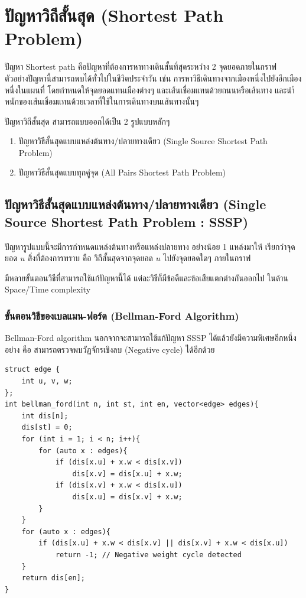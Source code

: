 \chapter{ปัญหาวิถีสั้นสุด (Shortest Path Problem)}

ปัญหา Shortest path คือปัญหาที่ต้องการหาทางเดินสั้นที่สุดระหว่าง 2 จุดยอดภายในกราฟ ตัวอย่างปัญหานี้สามารถพบได้ทั่วไปในชีวิตประจำวัน เช่น การหาวิธีเดินทางจากเมืองหนึ่งไปยังอีกเมืองหนึ่งในแผนที่ โดยกำหนดให้จุดยอดแทนเมืองต่างๆ และเส้นเชื่อมแทนด้วยถนนหรือเส้นทาง และนำ้หนักของเส้นเชื่อมแทนด้วยเวลาที่ใช้ในการเดินทางบนเส้นทางนั้นๆ

ปัญหาวิถีสั้นสุด สามารถแบบออกได้เป็น 2 รูปแบบหลักๆ
\begin{enumerate}
\item ปัญหาวิธีสั้นสุดแบบแหล่งต้นทาง/ปลายทางเดียว (Single Source Shortest Path Problem)
\item ปัญหาวิธีสั้นสุดแบบทุกคู่จุด (All Pairs Shortest Path Problem)
\end{enumerate}

\section{ปัญหาวิธีสั้นสุดแบบแหล่งต้นทาง/ปลายทางเดียว (Single Source Shortest Path Problem : SSSP)}

ปัญหารูปแบบนี้จะมีการกำหนดแหล่งต้นทางหรือแหล่งปลายทาง อย่างน้อย 1 แหล่งมาให้ เรียกว่าจุดยอด $u$  สิ่งที่ต้องการทราบ คือ วิถีสั้นสุดจากจุดยอด $u$ ไปยังจุดยอดใดๆ ภายในกราฟ

มีหลายขั้นตอนวิธีที่สามารถใช้แก้ปัญหานี้ได้ แต่ละวิธีก็มีข้อดีและข้อเสียแตกต่างกันออกไป ในด้าน Space/Time complexity

\subsection{ขั้นตอนวิธีของเบลแมน-ฟอร์ด (Bellman-Ford Algorithm)}

Bellman-Ford algorithm นอกจากจะสามารถใช้แก้ปัญหา SSSP ได้แล้วยังมีความพิเศษอีกหนึ่งอย่าง คือ สามารถตรวจพบวัฏจักรเชิงลบ (Negative cycle) ได้อีกด้วย

\newpage

\begin{lstlisting}
struct edge {
	int u, v, w;
};
int bellman_ford(int n, int st, int en, vector<edge> edges){
	int dis[n];
	dis[st] = 0;
	for (int i = 1; i < n; i++){
		for (auto x : edges){
			if (dis[x.u] + x.w < dis[x.v])
				dis[x.v] = dis[x.u] + x.w;
			if (dis[x.v] + x.w < dis[x.u])
				dis[x.u] = dis[x.v] + x.w;
		}
	}
	for (auto x : edges){
		if (dis[x.u] + x.w < dis[x.v] || dis[x.v] + x.w < dis[x.u])
			return -1; // Negative weight cycle detected
	}
	return dis[en];
}
\end{lstlisting}

